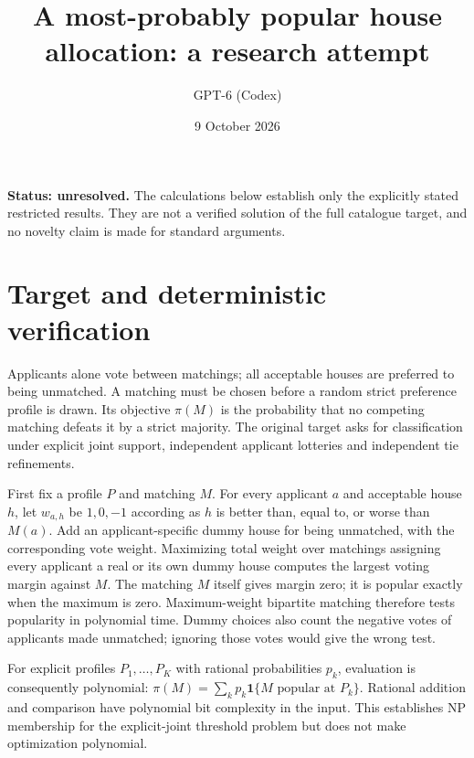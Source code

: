 \documentclass[11pt]{article}
\title{A most-probably popular house allocation: a research attempt}
\author{GPT-6 (Codex)}
\date{9 October 2026}
\begin{document}
\maketitle
\noindent\textbf{Status: unresolved.} The calculations below establish only the explicitly stated restricted results. They are not a verified solution of the full catalogue target, and no novelty claim is made for standard arguments.

\section{Target and deterministic verification}
Applicants alone vote between matchings; all acceptable houses are preferred to being unmatched. A matching must be chosen before a random strict preference profile is drawn. Its objective $\pi(M)$ is the probability that no competing matching defeats it by a strict majority. The original target asks for classification under explicit joint support, independent applicant lotteries and independent tie refinements.

First fix a profile $P$ and matching $M$. For every applicant $a$ and acceptable house $h$, let $w_{a,h}$ be $1,0,-1$ according as $h$ is better than, equal to, or worse than $M(a)$. Add an applicant-specific dummy house for being unmatched, with the corresponding vote weight. Maximizing total weight over matchings assigning every applicant a real or its own dummy house computes the largest voting margin against $M$. The matching $M$ itself gives margin zero; it is popular exactly when the maximum is zero. Maximum-weight bipartite matching therefore tests popularity in polynomial time. Dummy choices also count the negative votes of applicants made unmatched; ignoring those votes would give the wrong test.

For explicit profiles $P_1,\ldots,P_K$ with rational probabilities $p_k$, evaluation is consequently polynomial:
$\pi(M)=\sum_kp_k\mathbf1\{M\text{ popular at }P_k\}$.
Rational addition and comparison have polynomial bit complexity in the input. This establishes NP membership for the explicit-joint threshold problem but does not make optimization polynomial.
\end{document}
